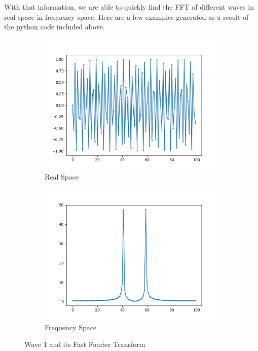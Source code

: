 \documentclass{amsproc}
\begin{document}
With that information, we are able to quickly find the FFT of different waves in real space in frequency space. Here are a few examples generated as a result of the python code included above. 

\begin{figure}[h]
\centering
\begin{subfigure}{.4\textwidth}
	\centering
	\includegraphics[scale=.3]{images/FFTOriginal1.png}
	\caption{Real Space}
	\label{fig:sub1}
\end{subfigure} %
\begin{subfigure}{.4\textwidth}
	\centering
	\includegraphics[scale=.3]{images/FFTResult1.png}
	\caption{Frequency Space}
	\label{fig:sub2}
\end{subfigure}
\caption{Wave 1 and its Fast Fourier Transform}
\label{fig:text1}
\end{figure}
\end{document}
